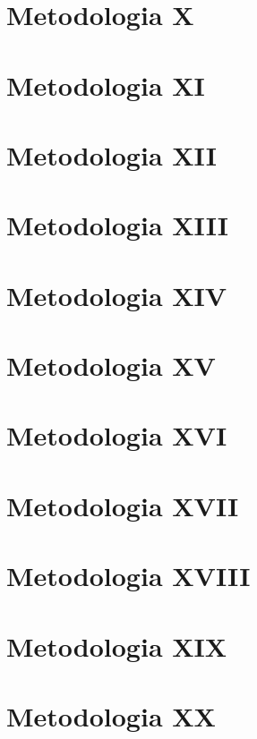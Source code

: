 \section{Metodologia X}

\clearpage

\section{Metodologia XI}

\clearpage

\section{Metodologia XII}

\clearpage

\section{Metodologia XIII}

\clearpage

\section{Metodologia XIV}

\clearpage

\section{Metodologia XV}

\clearpage

\section{Metodologia XVI}

\clearpage

\section{Metodologia XVII}

\clearpage

\section{Metodologia XVIII}

\clearpage

\section{Metodologia XIX}

\clearpage

\section{Metodologia XX}
